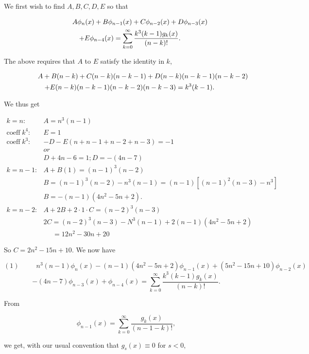 \begin{solution}
We first wish to find $A,B,C,D,E$ so that

\begin{eqnarray*}
\lefteqn{A \phi_n(x) + B \phi_{n-1}(x) + C \phi_{n-2}(x) + D \phi_{n-3}(x)} \\
& & + E \phi_{n-4}(x) = \displaystyle\sum_{k=0}^{\infty} \dfrac{k^3(k-1)g_k(x)}{(n-k)!}.
\end{eqnarray*}

The above requires that $A$ to $E$ satisfy the identity in $k$,

\begin{eqnarray*}
\lefteqn{A+B(n-k)+C(n-k)(n-k-1)+D(n-k)(n-k-1)(n-k-2)} \\
& & +E(n-k)(n-k-1)(n-k-2)(n-k-3)=k^3(k-1).
\end{eqnarray*}

We thus get

$$\begin{array}{ll}
k=n: & A=n^3(n-1) \\
\mathrm{coeff \hspace{3pt}} k^4: & E=1 \\
\mathrm{coeff \hspace{3pt}} k^3: & -D-E (n+n-1+n-2+n-3)=-1 \\
& or \\
& D+4n-6=1; D=-(4n-7) \\
k=n-1: & A+B(1)=(n-1)^3(n-2) \\
& B=(n-1)^3(n-2)-n^3(n-1) = (n-1)[(n-1)^2(n-3)-n^3] \\
& B=-(n-1)(4n^2-5n+2). \\
k=n-2: & A+2B+2 \cdot 1 \cdot C = (n-2)^3 (n-3) \\
& 2C = (n-2)^3 (n-3)-N^3(n-1)+2(n-1)(4n^2-5n+2) \\
&\hspace{16pt} = 12n^2-30n+20
\end{array}$$

So $C=2n^2-15n+10$. We now have

$$(1) \hspace{30pt} n^3(n-1)\phi_n(x) - (n-1)(4n^2-5n+2)\phi_{n-1}(x) + (5n^2-15n+10)\phi_{n-2}(x)$$
$$ -(4n-7)\phi_{n-3}(x) + \phi_{n-4}(x) = \displaystyle\sum_{k=0}^{\infty} \dfrac{k^3(k-1)g_k(x)}{(n-k)!}.$$

From

$$\phi_{n-1}(x) = \displaystyle\sum_{k=0}^{\infty} \dfrac{g_k(x)}{(n-1-k)!},$$

we get, with our usual convention that $g_s(x) \equiv 0$ for $s < 0$,


\end{solution}
